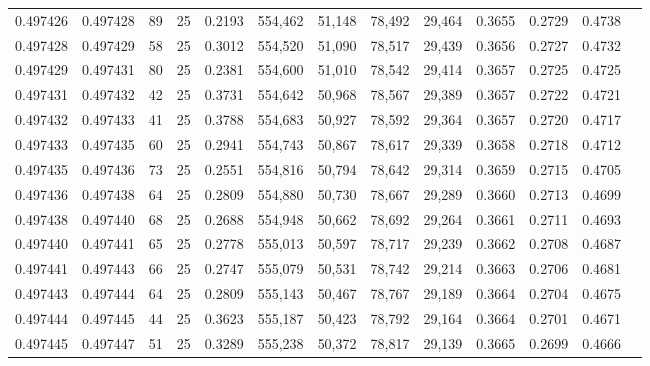\begin{tabular}{rrrrrrrrrrrrr}
0.497426 & 0.497428 &    89 &  25 &                                     0.2193 & 554,462 &  51,148 &  78,492 &  29,464 & 0.3655 & 0.2729 & 0.4738 \\
0.497428 & 0.497429 &    58 &  25 &                                     0.3012 & 554,520 &  51,090 &  78,517 &  29,439 & 0.3656 & 0.2727 & 0.4732 \\
0.497429 & 0.497431 &    80 &  25 &                                     0.2381 & 554,600 &  51,010 &  78,542 &  29,414 & 0.3657 & 0.2725 & 0.4725 \\
0.497431 & 0.497432 &    42 &  25 &                                     0.3731 & 554,642 &  50,968 &  78,567 &  29,389 & 0.3657 & 0.2722 & 0.4721 \\
0.497432 & 0.497433 &    41 &  25 &                                     0.3788 & 554,683 &  50,927 &  78,592 &  29,364 & 0.3657 & 0.2720 & 0.4717 \\
0.497433 & 0.497435 &    60 &  25 &                                     0.2941 & 554,743 &  50,867 &  78,617 &  29,339 & 0.3658 & 0.2718 & 0.4712 \\
0.497435 & 0.497436 &    73 &  25 &                                     0.2551 & 554,816 &  50,794 &  78,642 &  29,314 & 0.3659 & 0.2715 & 0.4705 \\
0.497436 & 0.497438 &    64 &  25 &                                     0.2809 & 554,880 &  50,730 &  78,667 &  29,289 & 0.3660 & 0.2713 & 0.4699 \\
0.497438 & 0.497440 &    68 &  25 &                                     0.2688 & 554,948 &  50,662 &  78,692 &  29,264 & 0.3661 & 0.2711 & 0.4693 \\
0.497440 & 0.497441 &    65 &  25 &                                     0.2778 & 555,013 &  50,597 &  78,717 &  29,239 & 0.3662 & 0.2708 & 0.4687 \\
0.497441 & 0.497443 &    66 &  25 &                                     0.2747 & 555,079 &  50,531 &  78,742 &  29,214 & 0.3663 & 0.2706 & 0.4681 \\
0.497443 & 0.497444 &    64 &  25 &                                     0.2809 & 555,143 &  50,467 &  78,767 &  29,189 & 0.3664 & 0.2704 & 0.4675 \\
0.497444 & 0.497445 &    44 &  25 &                                     0.3623 & 555,187 &  50,423 &  78,792 &  29,164 & 0.3664 & 0.2701 & 0.4671 \\
0.497445 & 0.497447 &    51 &  25 &                                     0.3289 & 555,238 &  50,372 &  78,817 &  29,139 & 0.3665 & 0.2699 & 0.4666 \\

\end{tabular}
